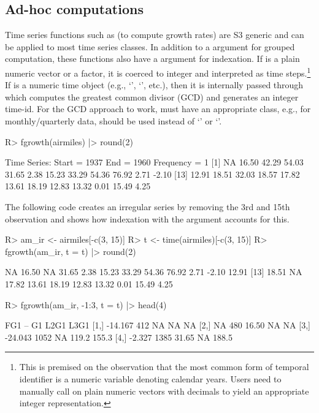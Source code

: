 \documentclass[article]{jss}
\newcommand{\class}[1]{`\code{#1}'}
\newcommand{\fct}[1]{\code{#1()}}
\begin{document}
\subsection{Ad-hoc computations}
%
Time series functions such as \fct{fgrowth} (to compute growth rates) are S3 generic and can be applied to most time series classes. In addition to a  argument for grouped computation, these functions also have a  argument for indexation. If  is a plain numeric vector or a factor, it is coerced to integer and interpreted as time steps.\footnote{This is premised on the observation that the most common form of temporal identifier is a numeric variable denoting calendar years. Users need to manually call  on plain numeric vectors with decimals to yield an appropriate integer representation.} If  is a numeric time object (e.g., \class{Date}, \class{POSIXct}, etc.), then it is internally passed through  which computes the greatest common divisor (GCD) and generates an integer time-id. For the GCD approach to work,  must have an appropriate class, e.g., for monthly/quarterly data,  should be used instead of \class{Date} or \class{POSIXct}. %
%
\begin{Schunk}
\begin{Sinput}
R> fgrowth(airmiles) |> round(2)
\end{Sinput}
\begin{Soutput}
Time Series:
Start = 1937 
End = 1960 
Frequency = 1 
 [1]    NA 16.50 42.29 54.03 31.65  2.38 15.23 33.29 54.36 76.92  2.71 -2.10
[13] 12.91 18.51 32.03 18.57 17.82 13.61 18.19 12.83 13.32  0.01 15.49  4.25
\end{Soutput}
\end{Schunk}
The following code creates an irregular series by removing the 3rd and 15th observation and shows how indexation with the  argument accounts for this.
%
\begin{Schunk}
\begin{Sinput}
R> am_ir <- airmiles[-c(3, 15)]
R> t <- time(airmiles)[-c(3, 15)]
R> fgrowth(am_ir, t = t) |> round(2)
\end{Sinput}
\begin{Soutput}
 [1]    NA 16.50    NA 31.65  2.38 15.23 33.29 54.36 76.92  2.71 -2.10 12.91
[13] 18.51    NA 17.82 13.61 18.19 12.83 13.32  0.01 15.49  4.25
\end{Soutput}
\begin{Sinput}
R> fgrowth(am_ir, -1:3, t = t) |> head(4)
\end{Sinput}
\begin{Soutput}
         FG1   --    G1  L2G1  L3G1
[1,] -14.167  412    NA    NA    NA
[2,]      NA  480 16.50    NA    NA
[3,] -24.043 1052    NA 119.2 155.3
[4,]  -2.327 1385 31.65    NA 188.5
\end{Soutput}
\end{Schunk}
\end{document}
